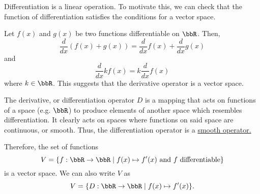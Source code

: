 \documentclass[a4paper, 12pt,oneside,openany]{book}
\begin{document}
Differentiation is a linear operation. To motivate this, we can check that the function of differentiation satisfies the conditions for a vector space.

Let $f(x)$ and $g(x)$ be two functions differentiable on $\bbR$. Then, $$\frac{d}{dx}(f(x)+g(x)) = \frac{d}{dx} f(x)+\frac{d}{dx}g(x)$$ and $$\frac{d}{dx} kf(x)= k\frac{d}{dx}f(x)$$ where $k\in\bbR$. This suggests that the derivative operator is a vector space. 

The derivative, or differentiation operator $D$ is a mapping that acts on functions of a space (e.g. $\bbR$) to produce elements of another space which resembles differentiation. It clearly acts on spaces where functions on said space are continuous, or smooth. Thus, the differentiation operator is a \href{https://www.youtube.com/watch?v=4TYv2PhG89A}{smooth operator.}

Therefore, the set of functions $$V = \{f: \bbR \to \bbR \mid f(x) \mapsto f'(x) \ \text{and}\ f\ \text{differentiable}\}$$ is a vector space. We can also write $V$ as $$V=\{D:\bbR \to \bbR \mid f(x) \mapsto f'(x)\}.$$
\end{document}
